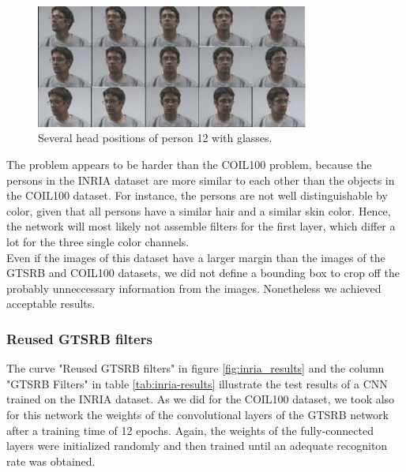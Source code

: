 \documentclass[11pt, a4paper]{article}
\begin{document}
\begin{figure}[h!]
	\centering
	\includegraphics[width=0.8\textwidth]{inria_different_angles}
	\caption{Several head positions of person 12 with glasses.}
	\label{fig:inria_different_angles}
\end{figure}

The problem appears to be harder than the COIL100 problem, because the persons in the INRIA dataset are more similar to each other than the objects in the COIL100 dataset. For instance, the persons are not well distinguishable by color, given that all persons have a similar hair and a similar skin color. Hence, the network will most likely not assemble filters for the first layer, which differ a lot for the three single color channels.\\
Even if the images of this dataset have a larger margin than the images of the GTSRB and COIL100 datasets, we did not define a bounding box to crop off the probably unneccessary information from the images. Nonetheless we achieved acceptable results.

\subsubsection{Reused GTSRB filters}

The curve "Reused GTSRB filters" in figure \ref{fig:inria_results} and the column "GTSRB Filters" in table \ref{tab:inria-results} illustrate the test results of a CNN trained on the INRIA dataset. As we did for the COIL100 dataset, we took also for this network the weights of the convolutional layers of the GTSRB network after a training time of 12 epochs. Again, the weights of the fully-connected layers were initialized randomly and then trained until an adequate recogniton rate was obtained.
\end{document}
